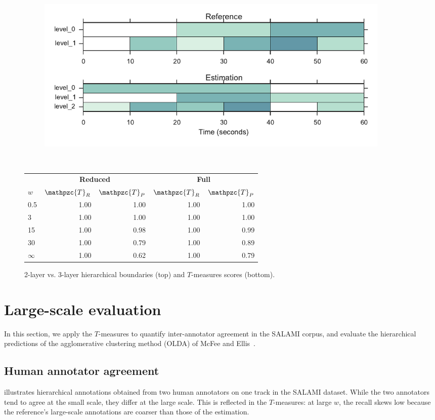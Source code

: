 \documentclass{article}
\def\shag{\ensuremath{\mathpzc{T}}}
\begin{document}
\begin{figure}[t]
  \centering
  \begin{subfigure}{0.5\textwidth}
    \centering
    \includegraphics[width=0.94\textwidth]{figs/hier-hiercomp.pdf}
  \end{subfigure}%
  \\
  \begin{minipage}{0.5\textwidth}
    \small
    \centering
    \vspace{10pt}
    \begin{tabular}{l|rr|rr}
      & \multicolumn{2}{c|}{\textbf{Reduced}} & \multicolumn{2}{c}{\textbf{Full}} \\
      $w$       & $\shag_R$    & $\shag_P$  & $\shag_R$ & $\shag_P$    \\
      \hline
      0.5       & 1.00       & 1.00      & 1.00 & 1.00\\     
      3         & 1.00       & 1.00      & 1.00 & 1.00\\
      15        & 1.00       & 0.98      & 1.00 & 0.99\\
      30        & 1.00       & 0.79      & 1.00 & 0.89\\
      $\infty$  & 1.00       & 0.62     & 1.00 & 0.79  
    \end{tabular}
  \end{minipage}
  \caption{2-layer vs. 3-layer hierarchical boundaries (top) and $T$-measures scores (bottom).}
  \label{fig:hier-hiercomp}
\end{figure}


\section{Large-scale evaluation}
In this section, we apply the $T$-measures to quantify inter-annotator agreement in the SALAMI corpus, and
evaluate the hierarchical predictions of the agglomerative clustering method (OLDA) of 
McFee and Ellis~\cite{McFee2014}.

\subsection{Human annotator agreement}
 illustrates hierarchical annotations obtained from two human annotators on one track in
the SALAMI dataset.
While the two annotators tend to agree at the small scale, they differ at the large scale.
This is reflected in the $T$-measures: at large $w$, the recall skews low because the 
reference's large-scale annotations are coarser than those of the estimation.
\end{document}
